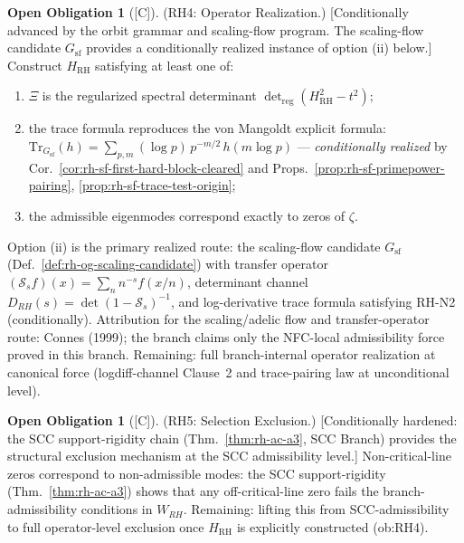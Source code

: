 \documentclass[12pt,oneside]{amsbook}
\theoremstyle{plain}
\theoremstyle{definition}
\newtheorem{obligation}[theorem]{Open Obligation}
\theoremstyle{remark}
\newcommand{\status}[1]{\textup{[#1]}}
\begin{document}
\begin{obligation}[\status{C}]\label{ob:RH4}
\textup{(RH4: Operator Realization.)}
\textup{[Conditionally advanced by the orbit grammar and scaling-flow
program. The scaling-flow candidate $G_{\mathrm{sf}}$ provides a
conditionally realized instance of option (ii) below.]}
Construct $H_{\mathrm{RH}}$ satisfying at least one of:
\begin{enumerate}[label=\textup{(\roman*)}]
 \item $\Xi$ is the regularized spectral determinant
 $\det_{\mathrm{reg}}(H_{\mathrm{RH}}^2 - t^2)$;
 \item the trace formula reproduces the von Mangoldt explicit formula:
 $\mathrm{Tr}_{G_{\mathrm{sf}}}(h) = \sum_{p,m}(\log p)\,
 p^{-m/2}\,h(m\log p)$ --- \emph{conditionally realized} by
 Cor.~\ref{cor:rh-sf-first-hard-block-cleared} and
 Props.~\ref{prop:rh-sf-primepower-pairing},
 \ref{prop:rh-sf-trace-test-origin};
 \item the admissible eigenmodes correspond exactly to zeros of $\zeta$.
\end{enumerate}
Option (ii) is the primary realized route: the scaling-flow candidate
$G_{\mathrm{sf}}$ (Def.~\ref{def:rh-og-scaling-candidate}) with
transfer operator $(\mathcal{S}_s f)(x) = \sum_n n^{-s} f(x/n)$,
determinant channel $D_{RH}(s) = \det(1-\mathcal{S}_s)^{-1}$, and
log-derivative trace formula satisfying RH-N2 (conditionally).
Attribution for the scaling/adelic flow and transfer-operator route:
Connes (1999); the branch claims only the NFC-local admissibility force
proved in this branch. Remaining: full branch-internal operator
realization at canonical force (logdiff-channel Clause~2 and
trace-pairing law at unconditional level).
\end{obligation}

\begin{obligation}[\status{C}]\label{ob:RH5}
\textup{(RH5: Selection Exclusion.)}
\textup{[Conditionally hardened: the SCC support-rigidity chain
(Thm.~\ref{thm:rh-ac-a3}, SCC Branch) provides the structural
exclusion mechanism at the SCC admissibility level.]}
Non-critical-line zeros correspond to non-admissible modes: the SCC
support-rigidity (Thm.~\ref{thm:rh-ac-a3}) shows that any
off-critical-line zero fails the branch-admissibility conditions in
$W_{RH}$. Remaining: lifting this from SCC-admissibility to full
operator-level exclusion once $H_{\mathrm{RH}}$ is explicitly
constructed (ob:RH4).
\end{obligation}
\end{document}
